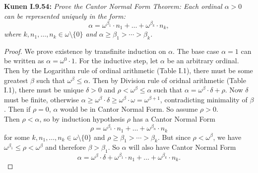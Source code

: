 \documentclass{article}
\begin{document}
\textbf{Kunen I.9.54:} \it Prove the Cantor Normal Form Theorem: Each
  ordinal $\alpha>0$ can be represented uniquely in the form:
  \[\alpha =\omega^{\beta_1}\cdot n_1 +\ldots +\omega^{\beta_k}\cdot n_k,\]
  where $k,n_1,\ldots,n_k\in\omega\setminus\{0\}$ and
  $\alpha\geq\beta_1>\cdots>\beta_k$.

  \begin{proof}
    We prove existence by transfinite induction on $\alpha$. The base case
    $\alpha=1$ can be written as $\alpha=\omega^0\cdot1$. For the inductive
    step, let $\alpha$ be an arbitrary ordinal. Then by the Logarithm rule
    of ordinal arithmetic (Table I.1), there must be some greatest $\beta$
    such that $\omega^\beta\leq\alpha$. Then by Division rule of oridnal
    arithmetic (Table I.1), there must be unique $\delta>0$ and
    $\rho<\omega^\beta\leq\alpha$ such that $\alpha=\omega^\beta\cdot\delta
    +\rho$. Now $\delta$ must be finite, otherwise $\alpha\geq\omega^\beta
    \cdot\delta \geq\omega^\beta\cdot\omega =\omega^{\beta+1}$,
    contradicting minimality of $\beta$. Then if $\rho=0$, $\alpha$ would
    be in Cantor Normal Form. So assume $\rho>0$. \\

    Then $\rho<\alpha$, so by induction hypothesis $\rho$ has a Cantor
    Normal Form 
    \[\rho =\omega^{\beta_1}\cdot n_1 +\ldots +\omega^{\beta_n}\cdot n_k\]
    for some $k,n_1,\ldots,n_k\in\omega\setminus\{0\}$ and
    $\rho\geq\beta_1>\cdots>\beta_k$. But since $\rho<\omega^\beta$, we
    have $\omega^{\beta_1}\leq\rho<\omega^\beta$ and therefore
    $\beta>\beta_1$. So $\alpha$ will also have Cantor Normal Form 
    \[\alpha =\omega^{\beta}\cdot \delta +\omega^{\beta_1}\cdot n_1 +\ldots
    +\omega^{\beta_k}\cdot n_k.\]


\end{proof}
\end{document}
